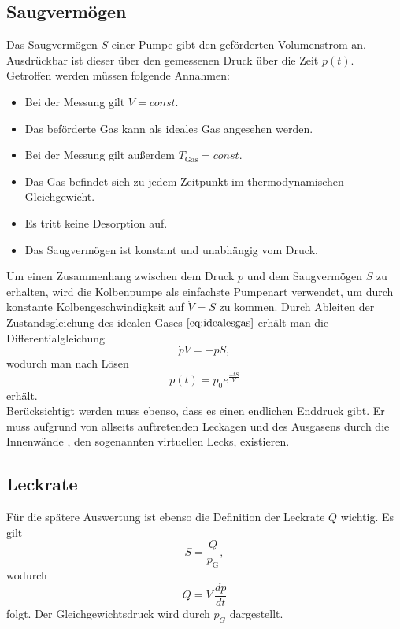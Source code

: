 \subsection{Saugvermögen}
Das Saugvermögen $S$ einer Pumpe gibt den geförderten Volumenstrom an.
Ausdrückbar ist dieser über den gemessenen Druck über die Zeit $p(t)$.\\
Getroffen werden müssen folgende Annahmen:
\begin{itemize}
  \item Bei der Messung gilt $V=const$.
  \item Das beförderte Gas kann als ideales Gas angesehen werden.
  \item Bei der Messung gilt außerdem $T_\text{Gas}=const$.
  \item Das Gas befindet sich zu jedem Zeitpunkt im thermodynamischen Gleichgewicht.
  \item Es tritt keine Desorption auf.
  \item Das Saugvermögen ist konstant und unabhängig vom Druck.
\end{itemize}
Um einen Zusammenhang zwischen dem Druck $p$ und dem Saugvermögen $S$ zu erhalten, wird die Kolbenpumpe als einfachste Pumpenart verwendet,
um durch konstante Kolbengeschwindigkeit auf $\dot{V}=S$ zu kommen.
Durch Ableiten der Zustandsgleichung des idealen Gases $\ref{eq:idealesgas}$ erhält man die Differentialgleichung
\begin{equation}
  \dot{p}V=-pS,
\end{equation}
wodurch man nach Lösen
\begin{equation}
  p(t)=p_0 e^{\frac{-tS}{V}}
\end{equation}
erhält.\\
Berücksichtigt werden muss ebenso, dass es einen endlichen Enddruck gibt.
Er muss aufgrund von allseits auftretenden Leckagen und des Ausgasens durch die Innenwände , den sogenannten virtuellen Lecks, existieren.
\subsection{Leckrate}
Für die spätere Auswertung ist ebenso die Definition der Leckrate $Q$ wichtig. Es gilt
\begin{equation}
  S=\frac{Q}{p_\text{G}},
\end{equation}
wodurch
\begin{equation}
  Q=V \, \frac{dp}{dt}
\end{equation}
folgt.
Der Gleichgewichtsdruck wird durch $p_G$ dargestellt.
